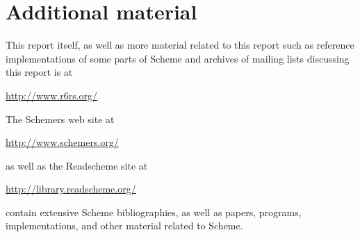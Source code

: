 \chapter{Additional material}
\label{additionalmaterialappendix}

This report itself, as well as more material related to this report
such as reference implementations of some parts of Scheme and archives of
mailing lists discussing this report is at
\begin{center}
\url{http://www.r6rs.org/}
\end{center}

The Schemers web site at
\begin{center}
\url{http://www.schemers.org/}
\end{center}
as well as the Readscheme site at
\begin{center}
\url{http://library.readscheme.org/}
\end{center}
contain extensive Scheme bibliographies, as well as papers,
programs, implementations, and other material related to Scheme.

